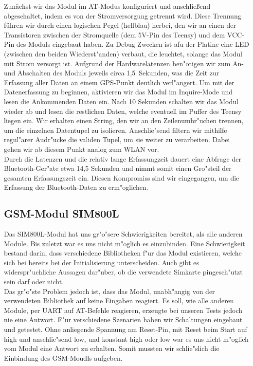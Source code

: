 \documentclass[a4paper,11pt, ngerman]{scrartcl}
\begin{document}
Zunächst wir das Modul im AT-Modus konfiguriert und anschließend abgeschaltet, indem es von der Stromversorgung getrennt wird. Diese Trennung führen wir durch einen logischen Pegel (hellblau) herbei, den wir an einen der Transistoren zwischen der Stromquelle (dem 5V-Pin des Teensy) und dem VCC-Pin des Moduls eingebaut haben. Zu Debug-Zwecken ist afu der Platine eine LED (zwischen den beiden Wiederst"anden) verbaut, die leuchtet, solange das Modul mit Strom versorgt ist. Aufgrund der Hardwarelatenzen ben"otigen wir zum An- und Abschalten des Moduls jeweils circa 1,5~Sekunden, was die Zeit zur Erfassung aller Daten an einem GPS-Punkt deutlich verl"angert. Um mit der Datenerfassung zu beginnen, aktivieren wir das Modul im Inquire-Mode und lesen die Ankommenden Daten ein. Nach 10 Sekunden schalten wir das Modul wieder ab und lesen die restlichen Daten, welche eventuell im Puffer des Teensy liegen ein. Wir erhalten einen String, den wir an den Zeilenumbr"uchen trennen, um die einzelnen Datentupel zu isolieren. Anschlie"send filtern wir mithilfe regul"arer Audr"ucke die validen Tupel, um sie weiter zu verarbeiten. Dabei gehen wir ab diesem Punkt analog zum WLAN vor.\\
Durch die Latenzen und die relativ lange Erfassungzeit dauert eine Abfrage der Bluetooth-Ger"ate etwa 14,5 Sekunden und nimmt somit einen Gro"steil der gesamten Erfassungszeit ein. Diesen Kompromiss sind wir eingegangen, um die Erfassung der Bluetooth-Daten zu erm"oglichen.
\subsection{GSM-Modul SIM800L}
Das SIM800L-Modul hat uns gr"o"sere Schwierigkeiten bereitet, als alle anderen Module. Bis zuletzt war es uns nicht m"oglich es einzubinden. Eine Schwierigkeit bestand darin, dass verschiedene Bibliotheken f"ur das Modul existieren, welche sich bei bereits bei der Initialisierung unterscheiden. Auch gibt es widerspr"uchliche Aussagen dar"uber, ob die verwendete Simkarte pingesch"utzt sein darf oder nicht.\\
Das gr"o"ste Problem jedoch ist, dass das Modul, unabh"angig von der verwendeten Bibliothek auf keine Eingaben reagiert. Es soll, wie alle anderen Module, per UART auf AT-Befehle reagieren, erzeugte bei unseren Tests jedoch nie eine Antwort. 
F"ur verschiedene Szenarien haben wir Schaltungen eingebaut und getestet. Ohne anliegende Spannung am Reset-Pin, mit Reset beim Start auf high und anschlie"send low, und konstant high oder low war es uns nicht m"oglich vom Modul eine Antwort zu erhalten. Somit mussten wir schlie"slich die Einbindung des GSM-Moudls aufgeben.
\end{document}
